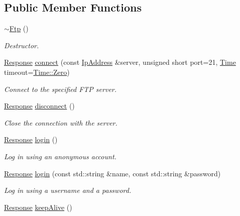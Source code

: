 \subsection*{Public Member Functions}
\begin{DoxyCompactItemize}
\item 
\mbox{\hyperlink{classsf_1_1_ftp_a2edfa8e9009caf27bce74459ae76dc52}{$\sim$\+Ftp}} ()
\begin{DoxyCompactList}\small\item\em Destructor. \end{DoxyCompactList}\item 
\mbox{\hyperlink{classsf_1_1_ftp_1_1_response}{Response}} \mbox{\hyperlink{classsf_1_1_ftp_af02fb3de3f450a50a27981961c69c860}{connect}} (const \mbox{\hyperlink{classsf_1_1_ip_address}{Ip\+Address}} \&server, unsigned short port=21, \mbox{\hyperlink{classsf_1_1_time}{Time}} timeout=\mbox{\hyperlink{classsf_1_1_time_a8db127b632fa8da21550e7282af11fa0}{Time\+::\+Zero}})
\begin{DoxyCompactList}\small\item\em Connect to the specified F\+TP server. \end{DoxyCompactList}\item 
\mbox{\hyperlink{classsf_1_1_ftp_1_1_response}{Response}} \mbox{\hyperlink{classsf_1_1_ftp_acf7459926f3391cd06bf84337ed6a0f4}{disconnect}} ()
\begin{DoxyCompactList}\small\item\em Close the connection with the server. \end{DoxyCompactList}\item 
\mbox{\hyperlink{classsf_1_1_ftp_1_1_response}{Response}} \mbox{\hyperlink{classsf_1_1_ftp_a686262bc377584cd50e52e1576aa3a9b}{login}} ()
\begin{DoxyCompactList}\small\item\em Log in using an anonymous account. \end{DoxyCompactList}\item 
\mbox{\hyperlink{classsf_1_1_ftp_1_1_response}{Response}} \mbox{\hyperlink{classsf_1_1_ftp_a99d8114793c1659e9d51d45cecdcd965}{login}} (const std\+::string \&name, const std\+::string \&password)
\begin{DoxyCompactList}\small\item\em Log in using a username and a password. \end{DoxyCompactList}\item 
\mbox{\hyperlink{classsf_1_1_ftp_1_1_response}{Response}} \mbox{\hyperlink{classsf_1_1_ftp_aa1127d442b4acb2105aa8060a39d04fc}{keep\+Alive}} ()

\end{DoxyCompactItemize}
